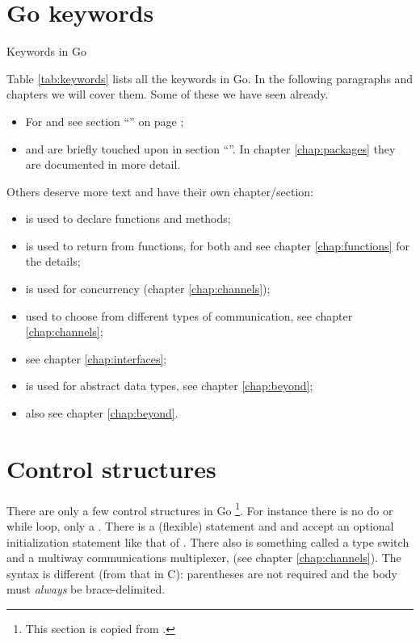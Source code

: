 \section{Go keywords}
\begin{table}[H]
\begin{center}
\caption{Keywords in Go}
\label{tab:keywords}

\end{center}
\end{table}
Table \ref{tab:keywords} lists all the keywords in Go. 
In the following paragraphs and chapters we will cover them. Some
of these we have seen already.
\begin{itemize}
\item For  and  see section ``'' on 
page \pageref{sec:vars};
\item {} and  are briefly touched upon in section ``''. 
In chapter \ref{chap:packages} they are documented in more detail.
\end{itemize}
Others deserve more text and have their own chapter/section:
\begin{itemize}
\item {} is used to declare functions and methods;
\item {} is used to return from functions, for both 
and  see chapter \ref{chap:functions} for the details;
\item {} is used for concurrency (chapter \ref{chap:channels});
\item {} used to choose from different types of communication, see chapter \ref{chap:channels};
\item {} see chapter \ref{chap:interfaces};
\item {} is used for abstract data types, see chapter \ref{chap:beyond};
\item {} also see chapter \ref{chap:beyond}.
\end{itemize}

\section{Control structures}
There are only a few control structures in 
Go \footnote{This section is copied from \cite{effective_go}.}.
For instance there is no do or while loop, only a 
. There is a (flexible)  statement and  and
 accept an
optional initialization statement like that of . There also is
something called a type switch and a multiway communications
multiplexer,  (see chapter \ref{chap:channels}). The syntax is 
different (from that in C): parentheses
are not required and the body must \emph{always} be brace-delimited.


